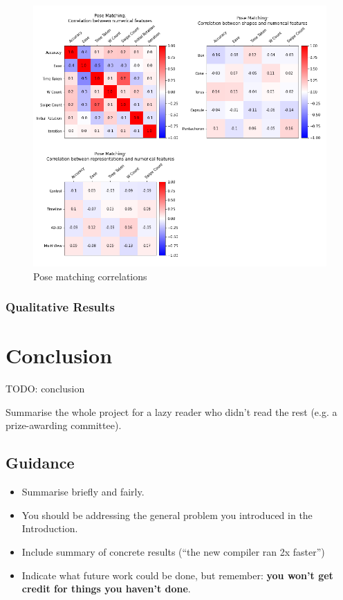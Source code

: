 \documentclass{l4proj}
\begin{document}
\begin{figure}[H]
  \includegraphics[width=\textwidth]{images/results/pose_matching_correlations.png}
  \caption{Pose matching correlations}
  \label{fig:shape_corr}
\end{figure}

\citep{glen_jaccard_2022}

\subsection{Qualitative Results}


\chapter{Conclusion}    

TODO: conclusion

Summarise the whole project for a lazy reader who didn't read the rest (e.g. a prize-awarding committee).
\section{Guidance}
\begin{itemize}
    \item
        Summarise briefly and fairly.
    \item
        You should be addressing the general problem you introduced in the
        Introduction.        
    \item
        Include summary of concrete results (``the new compiler ran 2x
        faster'')
    \item
        Indicate what future work could be done, but remember: \textbf{you
        won't get credit for things you haven't done}.
\end{itemize}
\end{document}
